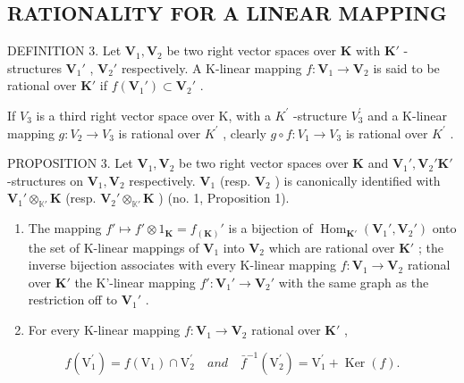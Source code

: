 \subsection{RATIONALITY FOR A LINEAR MAPPING}

DEFINITION 3. Let \(\mathbf{V}_1, \mathbf{V}_2\) be two right vector spaces over \(\mathbf{K}\) with \(\mathbf{K}'\) -structures \(\mathbf{V}_1'\) , \(\mathbf{V}_2'\) respectively. A K-linear mapping \(f: \mathbf{V}_1 \to \mathbf{V}_2\) is said to be rational over \(\mathbf{K}'\) if \(f(\mathbf{V}_1') \subset \mathbf{V}_2'\) .

If \(V_{3}\) is a third right vector space over K, with a \(K^{\prime}\) -structure \(V_{3}^{\prime}\) and a K-linear mapping \(g:V_{2}\rightarrow V_{3}\) is rational over \(K^{\prime}\) , clearly \(g\circ f:V_{1}\rightarrow V_{3}\) is rational over \(K^{\prime}\) .

PROPOSITION 3. Let \(\mathbf{V}_1, \mathbf{V}_2\) be two right vector spaces over \(\mathbf{K}\) and \(\mathbf{V}_1', \mathbf{V}_2' \mathbf{K}'\) -structures on \(\mathbf{V}_1, \mathbf{V}_2\) respectively. \(\mathbf{V}_1\) (resp. \(\mathbf{V}_2\) ) is canonically identified with \(\mathbf{V}_1' \otimes_{\mathbb{K}'} \mathbf{K}\) (resp. \(\mathbf{V}_2' \otimes_{\mathbb{K}'} \mathbf{K}\) ) (no. 1, Proposition 1).

\begin{enumerate}
\def\labelenumi{(\roman{enumi})}
\item
  The mapping \(f' \mapsto f' \otimes 1_{\mathbf{K}} = f_{(\mathbf{K})}'\) is a bijection of \(\operatorname{Hom}_{\mathbf{K}'}(\mathbf{V}_1', \mathbf{V}_2')\) onto the set of K-linear mappings of \(\mathbf{V}_1\) into \(\mathbf{V}_2\) which are rational over \(\mathbf{K}'\) ; the inverse bijection associates with every K-linear mapping \(f: \mathbf{V}_1 \to \mathbf{V}_2\) rational over \(\mathbf{K}'\) the K'-linear mapping \(f': \mathbf{V}_1' \to \mathbf{V}_2'\) with the same graph as the restriction off to \(\mathbf{V}_1'\) .
\item
  For every K-linear mapping \(f: \mathbf{V}_1 \to \mathbf{V}_2\) rational over \(\mathbf{K}'\) ,
\end{enumerate}

\[
f (\mathrm{V} _ {1} ^ {\prime}) = f (\mathrm{V} _ {1}) \cap \mathrm{V} _ {2} ^ {\prime} \quad and \quad \bar {f} ^ {- 1} (\mathrm{V} _ {2} ^ {\prime}) = \mathrm{V} _ {1} ^ {\prime} + \operatorname{Ker} (f).
\]

